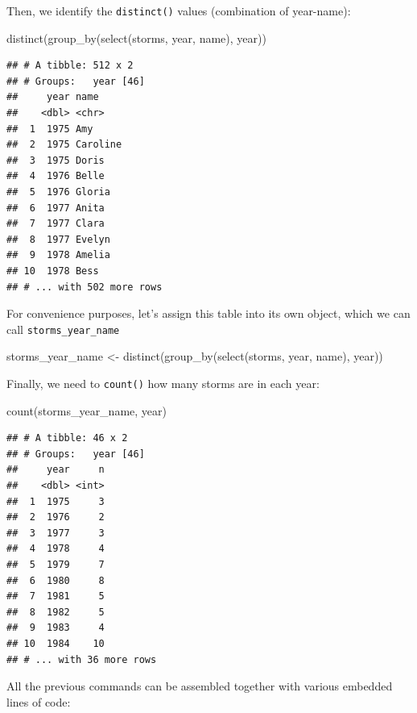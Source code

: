 \documentclass[
]{book}
\newenvironment{Shaded}{\begin{snugshade}}{\end{snugshade}}
\newcommand{\FunctionTok}[1]{\textcolor[rgb]{0.00,0.00,0.00}{#1}}
\newcommand{\NormalTok}[1]{#1}
\newcommand{\OtherTok}[1]{\textcolor[rgb]{0.56,0.35,0.01}{#1}}
\begin{document}
Then, we identify the \texttt{distinct()} values (combination of year-name):

\begin{Shaded}
\begin{Highlighting}[]
\FunctionTok{distinct}\NormalTok{(}\FunctionTok{group\_by}\NormalTok{(}\FunctionTok{select}\NormalTok{(storms, year, name), year))}
\end{Highlighting}
\end{Shaded}

\begin{verbatim}
## # A tibble: 512 x 2
## # Groups:   year [46]
##     year name    
##    <dbl> <chr>   
##  1  1975 Amy     
##  2  1975 Caroline
##  3  1975 Doris   
##  4  1976 Belle   
##  5  1976 Gloria  
##  6  1977 Anita   
##  7  1977 Clara   
##  8  1977 Evelyn  
##  9  1978 Amelia  
## 10  1978 Bess    
## # ... with 502 more rows
\end{verbatim}

For convenience purposes, let's assign this table into its own object,
which we can call \texttt{storms\_year\_name}

\begin{Shaded}
\begin{Highlighting}[]
\NormalTok{storms\_year\_name }\OtherTok{\textless{}{-}} \FunctionTok{distinct}\NormalTok{(}\FunctionTok{group\_by}\NormalTok{(}\FunctionTok{select}\NormalTok{(storms, year, name), year))}
\end{Highlighting}
\end{Shaded}

Finally, we need to \texttt{count()} how many storms are in each year:

\begin{Shaded}
\begin{Highlighting}[]
\FunctionTok{count}\NormalTok{(storms\_year\_name, year)}
\end{Highlighting}
\end{Shaded}

\begin{verbatim}
## # A tibble: 46 x 2
## # Groups:   year [46]
##     year     n
##    <dbl> <int>
##  1  1975     3
##  2  1976     2
##  3  1977     3
##  4  1978     4
##  5  1979     7
##  6  1980     8
##  7  1981     5
##  8  1982     5
##  9  1983     4
## 10  1984    10
## # ... with 36 more rows
\end{verbatim}

All the previous commands can be assembled together with various embedded lines
of code:
\end{document}
